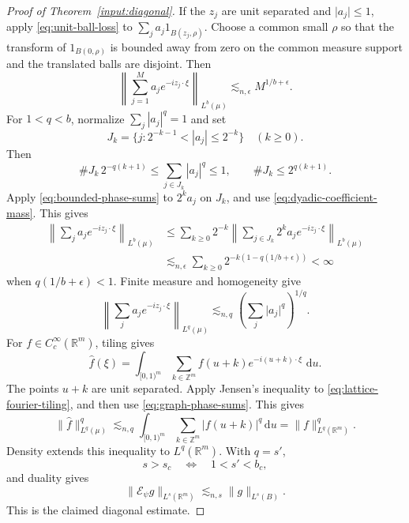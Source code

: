 \documentclass[11pt]{article}
\numberwithin{equation}{section}
\newcommand{\R}{\mathbb{R}}
\newcommand{\dd}{\,\mathrm{d}}
\newcommand{\norm}[1]{\lVert #1\rVert}
\newcommand{\abs}[1]{\lvert #1\rvert}
\begin{document}
\begin{proof}[Proof of Theorem~\ref{input:diagonal}]
If the \(z_j\) are unit separated and \(\abs{a_j}\le1\), apply
\eqref{eq:unit-ball-loss} to
\(\sum_j a_j1_{B(z_j,\rho)}\).
Choose a common small \(\rho\) so that the transform of
\(1_{B(0,\rho)}\) is bounded away from zero on the common measure
support and the translated balls are disjoint. Then
\begin{equation}\label{eq:bounded-phase-sums}
 \left\|\sum_{j=1}^M a_j e^{-iz_j\cdot\xi}\right\|_{L^b(\mu)}
 \lesssim_{n,\epsilon} M^{1/b+\epsilon}.
\end{equation}
For \(1<q<b\), normalize \(\sum_j|a_j|^q=1\) and set
\[
 J_k=\{j:2^{-k-1}<|a_j|\le2^{-k}\}\quad(k\ge0).
\]
Then
\begin{equation}\label{eq:dyadic-coefficient-mass}
 \#J_k\,2^{-q(k+1)}
 \le\sum_{j\in J_k}|a_j|^q\le1,\qquad
 \#J_k\le2^{q(k+1)}.
\end{equation}
Apply \eqref{eq:bounded-phase-sums} to \(2^ka_j\) on \(J_k\), and
use \eqref{eq:dyadic-coefficient-mass}. This gives
\begin{align*}
 \left\|\sum_j a_je^{-iz_j\cdot\xi}\right\|_{L^b(\mu)}
 &\le\sum_{k\ge0}2^{-k}
       \left\|\sum_{j\in J_k}2^ka_je^{-iz_j\cdot\xi}\right\|_{L^b(\mu)}\\
 &\lesssim_{n,\epsilon}
 \sum_{k\ge0}2^{-k(1-q(1/b+\epsilon))}<\infty
\end{align*}
when \(q(1/b+\epsilon)<1\). Finite measure and homogeneity give
\begin{equation}\label{eq:graph-phase-sums}
 \left\|\sum_j a_j e^{-iz_j\cdot\xi}\right\|_{L^q(\mu)}
 \lesssim_{n,q}\left(\sum_j\abs{a_j}^q\right)^{1/q}.
\end{equation}
For \(f\in C_c^\infty(\R^m)\), tiling gives
\begin{equation}\label{eq:lattice-fourier-tiling}
 \widehat f(\xi)
 =\int_{[0,1)^m}\sum_{k\in\mathbb Z^m}
       f(u+k)e^{-i(u+k)\cdot\xi}\,\dd u.
\end{equation}
The points \(u+k\) are unit separated. Apply Jensen's inequality to
\eqref{eq:lattice-fourier-tiling}, and then use
\eqref{eq:graph-phase-sums}. This gives
\[
 \norm{\widehat f}_{L^q(\mu)}^q
 \lesssim_{n,q}\int_{[0,1)^m}\sum_{k\in\mathbb Z^m}\abs{f(u+k)}^q\dd u
 = \norm f_{L^q(\R^m)}^q .
\]
Density extends this inequality to \(L^q(\R^m)\). With \(q=s'\),
\[
 s>s_c
 \quad\Longleftrightarrow\quad 1<s'<b_c,
\]
and duality gives
\[
 \norm{\mathcal E_\psi g}_{L^s(\R^m)}
 \lesssim_{n,s}\norm g_{L^s(B)}.
\]
This is the claimed diagonal estimate.
\end{proof}
\end{document}

